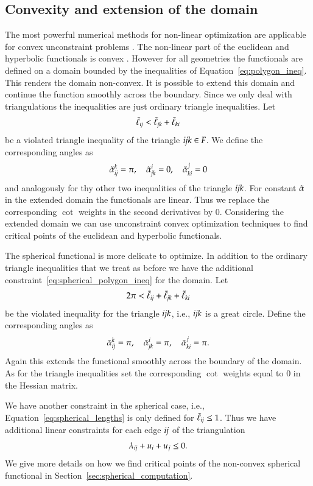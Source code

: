 \documentclass[Thesis]{subfiles}
\begin{document}
\subsection{Convexity and extension of the domain}
\label{sec:convexity_extension}

The most powerful numerical methods for non-linear optimization are applicable for convex unconstraint problems \cite{boyd2004convex}.
The non-linear part of the euclidean and hyperbolic functionals is convex \cite{Bobenko2010}. 
However for all geometries the functionals are defined on a domain bounded by the inequalities of Equation~\ref{eq:polygon_ineq}.
This renders the domain non-convex. 
It is possible to extend this domain and continue the function smoothly across the boundary.
Since we only deal with triangulations the inequalities are just ordinary triangle inequalities. 
Let 
\[\tilde{\ell}_{\it ij} < \tilde{\ell}_{\it jk} + \tilde{\ell}_{\it ki}\] 
be a violated triangle inequality of the triangle $\it ijk \in F$. We define the corresponding angles as
\begin{equation*}
\tilde{\alpha}^k_{\it ij} = \pi,\quad \tilde{\alpha}^i_{\it jk} = 0,\quad \tilde{\alpha}^j_{\it ki} = 0
\end{equation*}
and analogously for thy other two inequalities of the triangle $\it ijk$. 
For constant $\tilde{\alpha}$ in the extended domain the functionals are linear.
Thus we replace the corresponding $\cot$ weights in the second derivatives by $0$.
Considering the extended domain we can use unconstraint convex optimization techniques to find critical points of the euclidean and hyperbolic functionals.

The spherical functional is more delicate to optimize.
In addition to the ordinary triangle inequalities that we treat as before we have the additional constraint~\ref{eq:spherical_polygon_ineq} for the domain.
Let 
\[2\pi < \tilde{\ell}_{\it ij} + \tilde{\ell}_{\it jk} + \tilde{\ell}_{\it ki}\]
be the violated inequality for the triangle $\it ijk$, i.e., $\it ijk$ is a great circle. 
Define the corresponding angles as
\begin{equation*}
\tilde{\alpha}^k_{\it ij} = \pi,\quad \tilde{\alpha}^i_{\it jk} = \pi,\quad \tilde{\alpha}^j_{\it ki} = \pi.
\end{equation*}
Again this extends the functional smoothly across the boundary of the domain. 
As for the triangle inequalities set the corresponding $\cot$ weights equal to $0$ in the Hessian matrix.

We have another constraint in the spherical case, i.e., Equation~\ref{eq:spherical_lengths} is only defined for $\tilde\ell_{\it ij} \leq 1$.
Thus we have additional linear constraints for each edge $\it ij$ of the triangulation
\[\lambda_{\it ij} + u_i + u_j \leq 0.\]
We give more details on how we find critical points of the non-convex spherical functional in Section~\ref{sec:spherical_computation}.
\end{document}

